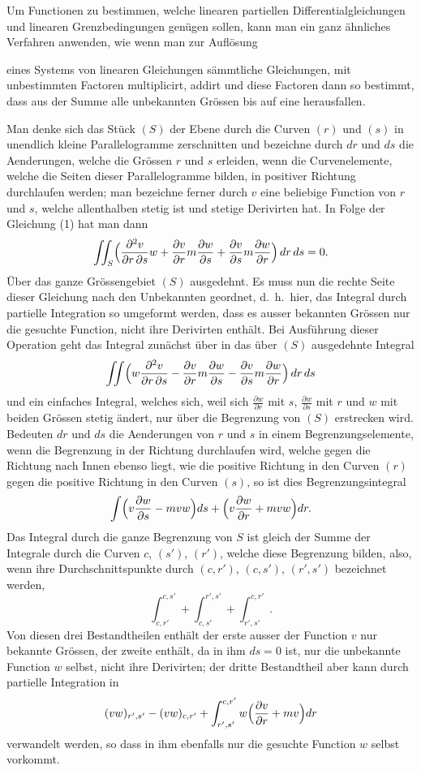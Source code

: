 \documentclass[12pt,a4paper]{article}
\begin{document}
Um Functionen zu bestimmen, welche linearen partiellen Differentialgleichungen und linearen Grenzbedingungen gen\"ugen sollen, kann man ein ganz \"ahnliches Verfahren anwenden, wie wenn man zur Aufl\"osung

eines Systems von linearen Gleichungen s\"ammtliche Gleichungen, mit unbestimmten Factoren multiplicirt, addirt und diese Factoren dann so bestimmt, dass aus der Summe alle unbekannten Gr\"ossen bis auf eine herausfallen.

Man denke sich das St\"uck $(S)$ der Ebene durch die Curven $(r)$ und $(s)$ in unendlich kleine Parallelogramme zerschnitten und bezeichne durch $dr$ und $ds$ die Aenderungen, welche die Gr\"ossen $r$ und $s$ erleiden, wenn die Curvenelemente, welche die Seiten dieser Parallelogramme bilden, in positiver Richtung durchlaufen werden; man bezeichne ferner durch $v$ eine beliebige Function von $r$ und $s$, welche allenthalben stetig ist und stetige Derivirten hat. In Folge der Gleichung (1) hat man dann
\[
\iint_{S}\Bigl(\frac{\partial^{2}v}{\partial r\,\partial s}w + \frac{\partial v}{\partial r}m\frac{\partial w}{\partial s} + \frac{\partial v}{\partial s}m\frac{\partial w}{\partial r}\Bigr)\,dr\,ds = 0.
\]
\"Uber das ganze Gr\"ossengebiet $(S)$ ausgedehnt. Es muss nun die rechte Seite dieser Gleichung nach den Unbekannten geordnet, d.~h.~hier, das Integral durch partielle Integration so umgeformt werden, dass es ausser bekannten Gr\"ossen nur die gesuchte Function, nicht ihre Derivirten enth\"alt. Bei Ausf\"uhrung dieser Operation geht das Integral zun\"achst \"uber in das \"uber $(S)$ ausgedehnte Integral
\[
\iint\Bigl(w\frac{\partial^{2}v}{\partial r\,\partial s} - \frac{\partial v}{\partial r}m\frac{\partial w}{\partial s} - \frac{\partial v}{\partial s}m\frac{\partial w}{\partial r}\Bigr)\,dr\,ds
\]
und ein einfaches Integral, welches sich, weil sich $\frac{\partial w}{\partial r}$ mit $s$, $\frac{\partial w}{\partial s}$ mit $r$ und $w$ mit beiden Gr\"ossen stetig \"andert, nur \"uber die Begrenzung von $(S)$ erstrecken wird. Bedeuten $dr$ und $ds$ die Aenderungen von $r$ und $s$ in einem Begrenzungselemente, wenn die Begrenzung in der Richtung durchlaufen wird, welche gegen die Richtung nach Innen ebenso liegt, wie die positive Richtung in den Curven $(r)$ gegen die positive Richtung in den Curven $(s)$, so ist dies Begrenzungsintegral
\[
\int\Bigl(v\frac{\partial w}{\partial s} - mvw\Bigr)ds + \Bigl(v\frac{\partial w}{\partial r} + mvw\Bigr)dr.
\]
Das Integral durch die ganze Begrenzung von $S$ ist gleich der Summe der Integrale durch die Curven $c$, $(s')$, $(r')$, welche diese Begrenzung bilden, also, wenn ihre Durchschnittspunkte durch $(c,r')$, $(c,s')$, $(r',s')$ bezeichnet werden,
\[
\int_{c,r'}^{c,s'} + \int_{c,s'}^{r',s'} + \int_{r',s'}^{c,r'}.
\]
Von diesen drei Bestandtheilen enth\"alt der erste ausser der Function $v$ nur bekannte Gr\"ossen, der zweite enth\"alt, da in ihm $ds = 0$ ist, nur die unbekannte Function $w$ selbst, nicht ihre Derivirten; der dritte Bestandtheil aber kann durch partielle Integration in
\[
(vw)_{r',s'} - (vw)_{c,r'} + \int_{r',s'}^{c,r'}w\Bigl(\frac{\partial v}{\partial r} + mv\Bigr)dr
\]
verwandelt werden, so dass in ihm ebenfalls nur die gesuchte Function $w$ selbst vorkommt.
\end{document}
